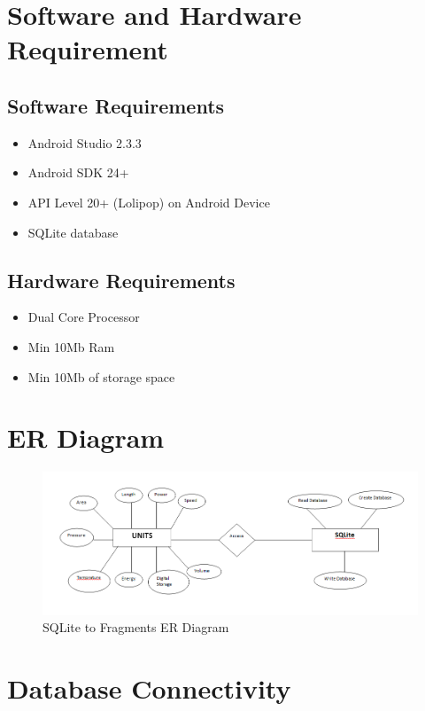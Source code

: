 \documentclass[a4paper, 12pt]{report}
\begin{document}
\section{Software and Hardware Requirement}
\subsection{Software Requirements}
\begin{itemize}
\item Android Studio 2.3.3
\item Android SDK 24+
\item API Level 20+ (Lolipop) on Android Device
\item SQLite database
\end{itemize}
\subsection{Hardware Requirements}
\begin{itemize}
\item Dual Core Processor
\item Min 10Mb Ram
\item Min 10Mb of storage space
\end{itemize}
\section{ER Diagram}
\begin{center}
\begin{figure}[h]
\centering
\includegraphics[scale = 0.5]{./er}
\caption{SQLite to Fragments ER Diagram}
\end{figure}
\end{center}
\section{Database Connectivity}
\end{document}
